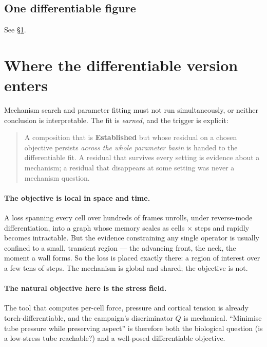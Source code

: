 \documentclass[11pt]{article}
\begin{document}
\subsection{One differentiable figure}

See \S\ref{sec:diff}.

\section{Where the differentiable version enters}
\label{sec:diff}

Mechanism search and parameter fitting must not run simultaneously, or neither conclusion is
interpretable. The fit is \emph{earned}, and the trigger is explicit:

\begin{quote}
A composition that is \textbf{Established} but whose residual on a chosen objective persists
\emph{across the whole parameter basin} is handed to the differentiable fit. A residual that
survives every setting is evidence about a mechanism; a residual that disappears at some setting
was never a mechanism question.
\end{quote}

\paragraph{The objective is local in space and time.} A loss spanning every cell over hundreds of
frames unrolls, under reverse-mode differentiation, into a graph whose memory scales as cells
$\times$ steps and rapidly becomes intractable. But the evidence constraining any single operator
is usually confined to a small, transient region --- the advancing front, the neck, the moment a
wall forms. So the loss is placed exactly there: a region of interest over a few tens of steps.
The mechanism is global and shared; the objective is not.

\paragraph{The natural objective here is the stress field.} The tool that computes per-cell force,
pressure and cortical tension is already torch-differentiable, and the campaign's discriminator
$Q$ is mechanical. ``Minimise tube pressure while preserving aspect'' is therefore both the
biological question (is a low-stress tube reachable?) and a well-posed differentiable objective.
\end{document}
